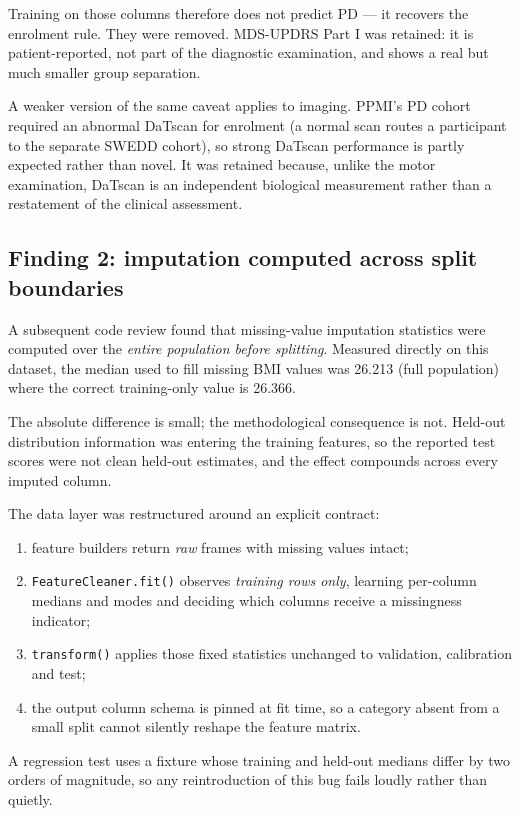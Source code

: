 \documentclass[11pt,a4paper]{article}
\newcommand{\code}[1]{\texttt{\small #1}}
\begin{document}
Training on those columns therefore does not predict PD --- it recovers the
enrolment rule. They were removed. MDS-UPDRS Part I was retained: it is
patient-reported, not part of the diagnostic examination, and shows a real but
much smaller group separation.

A weaker version of the same caveat applies to imaging. PPMI's PD cohort
required an abnormal DaTscan for enrolment (a normal scan routes a participant
to the separate SWEDD cohort), so strong DaTscan performance is partly expected
rather than novel. It was retained because, unlike the motor examination,
DaTscan is an independent biological measurement rather than a restatement of
the clinical assessment.

\subsection{Finding 2: imputation computed across split boundaries}

A subsequent code review found that missing-value imputation statistics were
computed over the \emph{entire population before splitting}. Measured directly
on this dataset, the median used to fill missing BMI values was 26.213
(full population) where the correct training-only value is 26.366.

The absolute difference is small; the methodological consequence is not.
Held-out distribution information was entering the training features, so the
reported test scores were not clean held-out estimates, and the effect compounds
across every imputed column.

The data layer was restructured around an explicit contract:

\begin{enumerate}
  \item feature builders return \emph{raw} frames with missing values intact;
  \item \code{FeatureCleaner.fit()} observes \emph{training rows only},
        learning per-column medians and modes and deciding which columns receive
        a missingness indicator;
  \item \code{transform()} applies those fixed statistics unchanged to
        validation, calibration and test;
  \item the output column schema is pinned at fit time, so a category absent
        from a small split cannot silently reshape the feature matrix.
\end{enumerate}

A regression test uses a fixture whose training and held-out medians differ by
two orders of magnitude, so any reintroduction of this bug fails loudly rather
than quietly.
\end{document}
